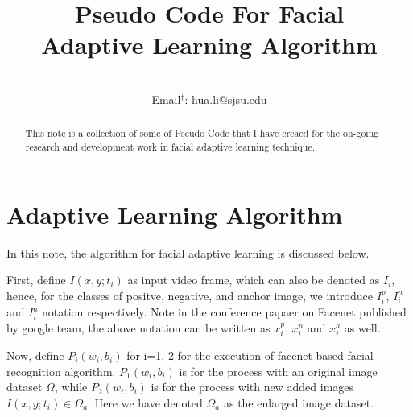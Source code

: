 \documentclass[conference]{IEEEtran}
\begin{document}
 

\title{Pseudo Code For Facial \\ 
Adaptive Learning Algorithm}
 
\author{
 \\
Email$^{\dagger}$: hua.li@sjsu.edu\\
}

\maketitle
\begin{abstract}
This note is a collection of some of Pseudo Code that I have creaed for the on-going research and development work in facial adaptive learning technique.   
\end{abstract}

\IEEEpeerreviewmaketitle

\section{Adaptive Learning Algorithm}
 
In this note, the algorithm for facial adaptive learning 
is discussed below. 
   

First, define $I(x,y;t_i)$ as input video frame, which can also be 
denoted as $I_i$, hence, for the classes of positve, negative, and 
anchor image, we introduce $I^p_i$, $I^n_i$ and $I^a_i$ notation 
respectively. Note in the conference papaer on Facenet published by 
google team, the above notation can be written as 
$x^p_i$, $x^n_i$ and $x^a_i$ as well. 

Now, define $P_i(w_i,b_i)$ for i=1, 2 for the execution of
facenet based facial recognition algorithm.   
$P_1(w_i,b_i)$ is for the process with an original 
image dataset $\Omega$, while $P_2(w_i,b_i)$ is for the process with
new added images $I(x,y;t_i) \in {\Omega}_a$. Here we have denoted 
${\Omega}_a$ as the enlarged image dataset. 
\end{document}
